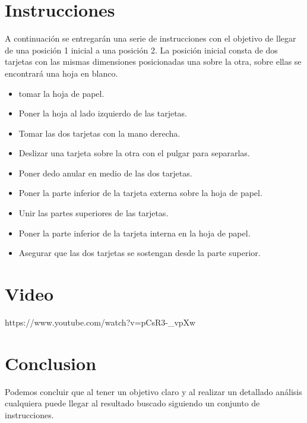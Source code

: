 \documentclass{article}
\begin{document}
\section{Instrucciones} \label{contenido}
A continuación se entregarán una serie de instrucciones con el objetivo de llegar de una posición 1 inicial a una posición 2. La posición inicial consta de dos tarjetas con las mismas dimensiones posicionadas una sobre la otra, sobre ellas se encontrará una hoja en blanco.
\begin{itemize}
    \item tomar la hoja de papel.
    \item Poner la hoja al lado izquierdo de las tarjetas.
    \item Tomar las dos tarjetas con la mano derecha.
    \item Deslizar una tarjeta sobre la otra con el pulgar para separarlas.
    \item Poner dedo anular en medio de las dos tarjetas.
    \item Poner la parte inferior de la tarjeta externa sobre la hoja de papel.
    \item Unir las partes superiores de las tarjetas.
    \item Poner la parte inferior de la tarjeta interna en la hoja de papel.
    \item Asegurar que las dos tarjetas se sostengan desde la parte superior.
\end{itemize}

\section{Video}

https://www.youtube.com/watch?v=pCsR3-_vpXw

\section{Conclusion}
Podemos concluir que al tener un objetivo claro y al realizar un detallado análisis cualquiera puede llegar al resultado buscado siguiendo un conjunto de instrucciones.




\end{document}
